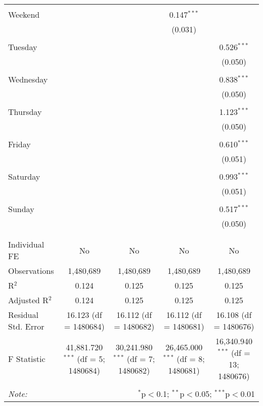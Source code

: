 \documentclass[
]{article}
\begin{document}
\begin{table}[!htbp]
{\begin{tabular}{@{\extracolsep{5pt}}lcccc}
  & & & & \\ 
 Weekend &  &  & 0.147$^{***}$ &  \\ 
  &  &  & (0.031) &  \\ 
  & & & & \\ 
 Tuesday &  &  &  & 0.526$^{***}$ \\ 
  &  &  &  & (0.050) \\ 
  & & & & \\ 
 Wednesday &  &  &  & 0.838$^{***}$ \\ 
  &  &  &  & (0.050) \\ 
  & & & & \\ 
 Thursday &  &  &  & 1.123$^{***}$ \\ 
  &  &  &  & (0.050) \\ 
  & & & & \\ 
 Friday &  &  &  & 0.610$^{***}$ \\ 
  &  &  &  & (0.051) \\ 
  & & & & \\ 
 Saturday &  &  &  & 0.993$^{***}$ \\ 
  &  &  &  & (0.051) \\ 
  & & & & \\ 
 Sunday &  &  &  & 0.517$^{***}$ \\ 
  &  &  &  & (0.050) \\ 
  & & & & \\ 
\hline \\[-1.8ex] 
Individual FE & No & No & No & No \\ 
Observations & 1,480,689 & 1,480,689 & 1,480,689 & 1,480,689 \\ 
R$^{2}$ & 0.124 & 0.125 & 0.125 & 0.125 \\ 
Adjusted R$^{2}$ & 0.124 & 0.125 & 0.125 & 0.125 \\ 
Residual Std. Error & 16.123 (df = 1480684) & 16.112 (df = 1480682) & 16.112 (df = 1480681) & 16.108 (df = 1480676) \\ 
F Statistic & 41,881.720$^{***}$ (df = 5; 1480684) & 30,241.980$^{***}$ (df = 7; 1480682) & 26,465.000$^{***}$ (df = 8; 1480681) & 16,340.940$^{***}$ (df = 13; 1480676) \\ 
\hline 
\hline \\[-1.8ex] 
\textit{Note:}  & \multicolumn{4}{r}{$^{*}$p$<$0.1; $^{**}$p$<$0.05; $^{***}$p$<$0.01} \\ 
\end{tabular}
} 
\end{table} 
\newpage
\end{document}
